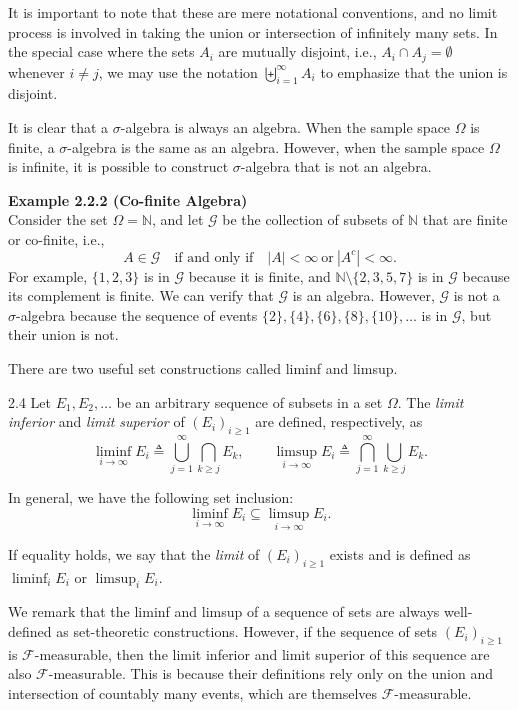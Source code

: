 It is important to note that these are mere notational conventions, and no limit process is involved in taking the union or intersection of infinitely many sets. In the special case where the sets $A_i$ are mutually disjoint, i.e., $A_i\cap A_j=\emptyset$ whenever $i\neq j$, we may use the notation $\biguplus_{i=1}^{\infty} A_i$ to emphasize that the union is disjoint.

It is clear that a $\sigma$-algebra is always an algebra. When the sample space $\Omega$ is finite, a $\sigma$-algebra is the same as an algebra. However, when the sample space $\Omega$ is infinite, it is possible to construct $\sigma$-algebra that is not an algebra.

\textbf{Example 2.2.2 (Co-finite Algebra)} \\
Consider the set $\Omega=\mathbb{N}$, and let $\mathcal{G}$ be the collection of subsets of $\mathbb{N}$ that are finite or co-finite, i.e.,
\[
A\in \mathcal{G}
\quad \text{if and only if} \quad
|A|<\infty \ \text{or}\ |A^c|<\infty.
\]
For example, $\{1,2,3\}$ is in $\mathcal{G}$ because it is finite, and $\mathbb{N}\setminus \{2,3,5,7\}$ is in $\mathcal{G}$ because its complement is finite. We can verify that $\mathcal{G}$ is an algebra. However, $\mathcal{G}$ is not a $\sigma$-algebra because the sequence of events $\{2\},\{4\},\{6\},\{8\},\{10\},\dots$ is in $\mathcal{G}$, but their union is not.

There are two useful set constructions called liminf and limsup.

\begin{defbox}{2.4}
Let $E_1,E_2,\dots$ be an arbitrary sequence of subsets in a set $\Omega$. The \textit{limit inferior} and \textit{limit superior} of $(E_i)_{i\ge 1}$ are defined, respectively, as
\[
\liminf_{i\to\infty} E_i
\triangleq
\bigcup_{j=1}^{\infty}\bigcap_{k\ge j} E_k,
\qquad
\limsup_{i\to\infty} E_i
\triangleq
\bigcap_{j=1}^{\infty}\bigcup_{k\ge j} E_k.
\]

In general, we have the following set inclusion:
\[
\liminf_{i\to\infty} E_i \subseteq \limsup_{i\to\infty} E_i.
\]

If equality holds, we say that the \textit{limit} of $(E_i)_{i\ge 1}$ exists and is defined as $\liminf_i E_i$ or $\limsup_i E_i$.
\end{defbox}

We remark that the liminf and limsup of a sequence of sets are always well-defined as set-theoretic constructions. However, if the sequence of sets $(E_i)_{i\ge 1}$ is $\mathcal{F}$-measurable, then the limit inferior and limit superior of this sequence are also $\mathcal{F}$-measurable. This is because their definitions rely only on the union and intersection of countably many events, which are themselves $\mathcal{F}$-measurable.

